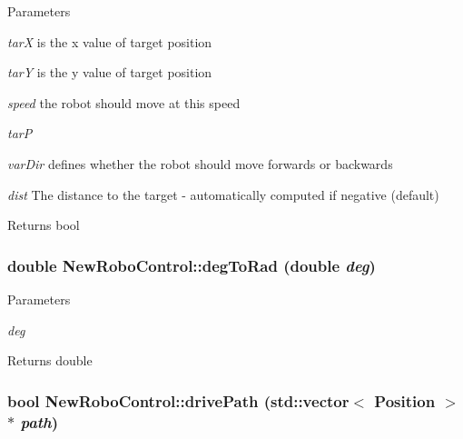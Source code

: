 \begin{DoxyParams}{Parameters}
\item[{\em tarX}]is the x value of target position \item[{\em tarY}]is the y value of target position \item[{\em speed}]the robot should move at this speed \item[{\em tarP}]\item[{\em varDir}]defines whether the robot should move forwards or backwards \item[{\em dist}]The distance to the target -\/ automatically computed if negative (default) \end{DoxyParams}
\begin{DoxyReturn}{Returns}
bool 
\end{DoxyReturn}
\hypertarget{classNewRoboControl_a44def2cefef0f6c41b180bda044dfdfb}{
\subsubsection[{degToRad}]{\setlength{\rightskip}{0pt plus 5cm}double NewRoboControl::degToRad (double {\em deg})}}
\label{classNewRoboControl_a44def2cefef0f6c41b180bda044dfdfb}

\begin{DoxyParams}{Parameters}
\item[{\em deg}]\end{DoxyParams}
\begin{DoxyReturn}{Returns}
double 
\end{DoxyReturn}
\hypertarget{classNewRoboControl_a9816eae1b7c90dbb74a7e0365e2b57e9}{
\subsubsection[{drivePath}]{\setlength{\rightskip}{0pt plus 5cm}bool NewRoboControl::drivePath (std::vector$<$ Position $>$ $\ast$ {\em path})}}
\label{classNewRoboControl_a9816eae1b7c90dbb74a7e0365e2b57e9}

